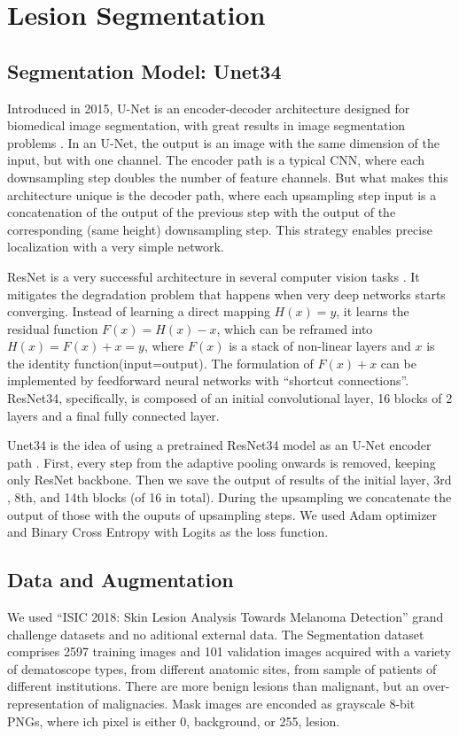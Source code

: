\section{Lesion Segmentation}
\label{segmentation}

\subsection{Segmentation Model: Unet34}
Introduced in 2015, U-Net is an encoder-decoder architecture designed for biomedical image segmentation\cite{olaf}, with great results in image segmentation problems \cite{iglovikov}. In an U-Net, the output is an image with the same dimension of the input, but with one channel.  The encoder path is a typical CNN, where each downsampling step doubles the number of feature channels. But what makes this architecture unique is the decoder path, where each upsampling step input is a concatenation of the output of the previous step with the output of the corresponding (same height) downsampling step. This strategy enables precise localization with a very simple network. 

ResNet is a very successful architecture in several computer vision tasks \cite{he}. It mitigates the degradation problem that happens when very deep networks starts converging. Instead of learning a direct mapping $H(x) = y$, it learns the residual function  $F(x) = H(x)-x$, which can be reframed into $H(x) = F(x)+x = y$, where $F(x)$ is a stack of non-linear layers and $x$ is the identity function(input=output). The formulation of $F(x)+x$ can be implemented by feedforward neural networks with “shortcut connections”. ResNet34, specifically, is composed of an initial convolutional layer, 16 blocks of 2 layers and a final fully connected layer.

Unet34 is the idea of using a pretrained ResNet34 model as an U-Net encoder path \cite{fastai}. First, every step from the adaptive pooling onwards is removed, keeping only ResNet backbone. Then we save the output of results of the initial layer, 3rd , 8th, and 14th blocks (of 16 in total). During the upsampling we concatenate the output of those with the ouputs of upsampling steps. We used Adam optimizer and Binary Cross Entropy with Logits as the loss function.

\subsection{Data and Augmentation}
We used “ISIC 2018: Skin Lesion Analysis Towards Melanoma Detection” grand challenge datasets \cite{codella, ham} and no aditional external data. The Segmentation dataset comprises 2597 training images and 101 validation images acquired with a variety of dematoscope types, from different anatomic sites, from sample of patients of different institutions. There are more benign lesions than malignant, but an over-representation of malignacies. Mask images are enconded as grayscale 8-bit PNGs, where ich pixel is either 0, background, or 255, lesion. 

